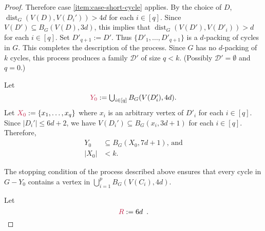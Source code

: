 \documentclass{patmorin}
\DeclareMathOperator{\dist}{dist}
\begin{document}
\begin{proof}
   Therefore case \cref{item:case-short-cycle} applies.  By the choice of $D$,  
   $\dist_G(V(D),V(D_i'))>4d$ for each $i\in[q]$.  Since $V(D')\subseteq B_G(V(D),3d)$, this implies that $\dist_G(V(D'),V(D'_i))>d$ for each $i\in[q]$. Set $D'_{q+1}:=D'$. 
   Thus $\{D'_1,\ldots,D'_{q+1}\}$ is a $d$-packing of cycles in $G$.  
   This completes the description of the process.
   Since $G$ has no $d$-packing of $k$ cycles, this process produces a family $\mathcal{D'}$ of size $q<k$. 
   (Possibly $\mathcal{D'}=\emptyset$ and $q=0$.) 

   Let
   \[
        \textstyle\mathdefin{Y_0}:=\bigcup_{i\in[q]}B_G(V(D'_i),4d).
   \]
  Let $\mathdefin{X_0}:=\{x_1,\ldots,x_{q}\}$ where  $x_i$ is an arbitrary vertex of $D'_i$ for each $i\in[q]$. 
  Since $|D_i'|\leq 6d+2$, we have $V(D_i')\subseteq B_G(x_i,3d+1)$ for each $i\in[q]$. 
  Therefore, 
\begin{align}
  Y_0&\subseteq B_G(X_0,7d+1)\text{, and}\label{eq:M-contained-in-a-ball}\\
  |X_0|&< k.\label{eq:XM-size}
\end{align}

The stopping condition of the process described above ensures that 
every cycle in $G-Y_0$ contains a vertex in $\bigcup_{i=1}^p B_G(V(C_i),4d)$.

Let
\[
\mathdefin{R}:=6d\enspace .
\]


\end{proof}
\end{document}
